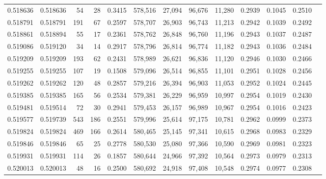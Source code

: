 \begin{tabular}{rrrrrrrrrrrrr}
0.518636 & 0.518636 &    54 &    28 &                                     0.3415 & 578,516 &  27,094 &  96,676 &  11,280 & 0.2939 & 0.1045 & 0.2510 \\
0.518791 & 0.518791 &   191 &    67 &                                     0.2597 & 578,707 &  26,903 &  96,743 &  11,213 & 0.2942 & 0.1039 & 0.2492 \\
0.518861 & 0.518894 &    55 &    17 &                                     0.2361 & 578,762 &  26,848 &  96,760 &  11,196 & 0.2943 & 0.1037 & 0.2487 \\
0.519086 & 0.519120 &    34 &    14 &                                     0.2917 & 578,796 &  26,814 &  96,774 &  11,182 & 0.2943 & 0.1036 & 0.2484 \\
0.519209 & 0.519209 &   193 &    62 &                                     0.2431 & 578,989 &  26,621 &  96,836 &  11,120 & 0.2946 & 0.1030 & 0.2466 \\
0.519255 & 0.519255 &   107 &    19 &                                     0.1508 & 579,096 &  26,514 &  96,855 &  11,101 & 0.2951 & 0.1028 & 0.2456 \\
0.519262 & 0.519262 &   120 &    48 &                                     0.2857 & 579,216 &  26,394 &  96,903 &  11,053 & 0.2952 & 0.1024 & 0.2445 \\
0.519385 & 0.519385 &   165 &    56 &                                     0.2534 & 579,381 &  26,229 &  96,959 &  10,997 & 0.2954 & 0.1019 & 0.2430 \\
0.519481 & 0.519514 &    72 &    30 &                                     0.2941 & 579,453 &  26,157 &  96,989 &  10,967 & 0.2954 & 0.1016 & 0.2423 \\
0.519577 & 0.519739 &   543 &   186 &                                     0.2551 & 579,996 &  25,614 &  97,175 &  10,781 & 0.2962 & 0.0999 & 0.2373 \\
0.519824 & 0.519824 &   469 &   166 &                                     0.2614 & 580,465 &  25,145 &  97,341 &  10,615 & 0.2968 & 0.0983 & 0.2329 \\
0.519846 & 0.519846 &    65 &    25 &                                     0.2778 & 580,530 &  25,080 &  97,366 &  10,590 & 0.2969 & 0.0981 & 0.2323 \\
0.519931 & 0.519931 &   114 &    26 &                                     0.1857 & 580,644 &  24,966 &  97,392 &  10,564 & 0.2973 & 0.0979 & 0.2313 \\
0.520013 & 0.520013 &    48 &    16 &                                     0.2500 & 580,692 &  24,918 &  97,408 &  10,548 & 0.2974 & 0.0977 & 0.2308 \\

\end{tabular}
